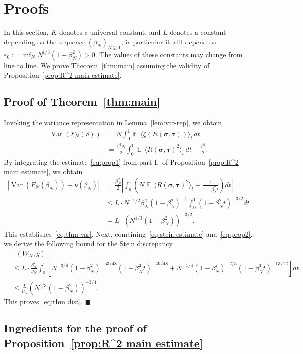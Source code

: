 \documentclass[letterpaper,11pt,reqno]{amsart}
\renewcommand{\leq}{\leqslant}
\renewcommand{\geq}{\geqslant}
\newcommand{\ra}{\rangle}
\newcommand{\la}{\langle}
\newcommand{\eps}{\varepsilon}
\newcommand{\abs}[1]{\left\vert#1\right\vert}
\def\qed{ \hfill $\blacksquare$}
\newcommand{\mvgs}{\boldsymbol{\sigma}}\newcommand{\mvgS}{\boldsymbol{\Sigma}}\newcommand{\mvgt}{\boldsymbol{\tau}}
\DeclareMathOperator{\E}{\mathds{E}}
\DeclareMathOperator{\var}{Var}
\DeclareMathOperator{\dtv}{d_{TV}}
\begin{document}
\section{Proofs}
In this section, \(K\) denotes a universal constant, and \(L\) denotes a constant depending on the sequence \((\beta_N)_{N \geq 1}\), in particular it will depend on $\eps_{0}:=\inf_{N}N^{1/3}(1-\beta_{N}^{2})>0$. The values of these constants may change from line to line. We prove Theorem~\ref{thm:main} assuming the validity of Proposition~\ref{prop:R^2 main estimate}. 

\subsection{Proof of Theorem~\ref{thm:main}}
Invoking the variance representation in Lemma~\ref{lem:var-rep}, we obtain
\begin{align*}
    \var(F_N(\beta))
    &= N \int_0^1 \E \, \la \xi(R(\mvgs, \mvgt)) \ra_t \, dt \\
    &= \frac{\beta^2 N}{2} \int_0^1 \E \, \la R(\mvgs, \mvgt)^2 \ra_t \, dt - \frac{\beta^2}{2}.
\end{align*}
By integrating the estimate~\eqref{eq:prop1} from part I.~of Proposition~\ref{prop:R^2 main estimate}, we obtain
\begin{align*}
    \abs{\var(F_N(\beta_N)) - \nu(\beta_N)}
    &= \frac{\beta_N^2}{2} \abs{\int_0^1 \left(N\E \, \la R(\mvgs, \mvgt)^2 \ra_t - \frac{1}{1-\beta_N^2 t}\right) dt} \\
    &\leq L \cdot N^{-1/2} \beta_N^2 (1-\beta_N^2)^{-1} \int_0^{1} (1-\beta_N^2 t)^{-3/2} dt \\
    &= L \cdot \left( N^{1/3}(1-\beta_N^2) \right)^{-3/2}.
\end{align*}
This establishes~\eqref{eq:thm var}. Next, combining~\eqref{eq:stein estimate} and~\eqref{eq:prop2}, we derive the following bound for the Stein discrepancy
\begin{align*}
    &\dtv(W_{N},g) \\
    & \leq L \cdot \frac{\beta_N^2}{\nu_N} \int_0^1  \left[N^{-3/8} (1-\beta_N^2)^{-53/48}(1-\beta_N^2 t)^{-49/48} + N^{-1/4} (1-\beta_N^2)^{-2/3}(1-\beta_N^2 t)^{-13/12}\right]\!dt\\
    & \leq \frac{L}{\nu_N}  \left( N^{1/3} (1-\beta_N^2) \right)^{-3/4}.
\end{align*}
This proves~\eqref{eq:thm dist}.\qed

\subsection{Ingredients for the proof of Proposition~\ref{prop:R^2 main estimate}}
\end{document}
